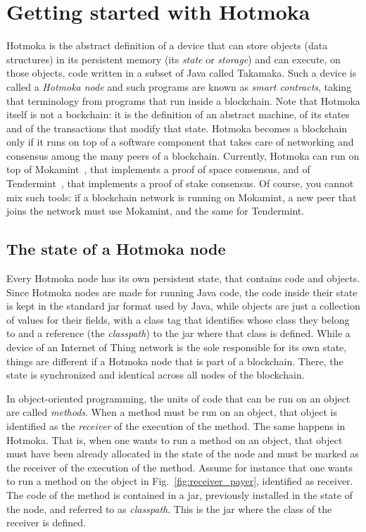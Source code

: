 \chapter{Getting started with Hotmoka}\label{ch:getting_started_with_hotmoka}

Hotmoka is the abstract definition of a device that can store
objects (data structures) in its persistent memory
(its \emph{state} or \emph{storage})
and can execute, on those objects,
code written in a subset of Java called Takamaka. Such a device is
called a \emph{Hotmoka node} and such programs are known as
\emph{smart contracts}, taking that terminology from programs that run inside
a blockchain. Note that Hotmoka itself is not a bockchain: it is the
definition of an abstract machine, of its states and of the transactions
that modify that state. Hotmoka becomes a blockchain only if it runs on top
of a software component that takes care of networking and consensus among
the many peers of a blockchain. Currently, Hotmoka can run on top of
Mokamint~\cite{mokamint_github}, that implements a proof of space consensus,
and of Tendermint~\cite{Tendermint}, that implements a proof of stake consensus.
Of course, you cannot mix such tools: if a blockchain network is running
on Mokamint, a new peer that joins the network must use Mokamint, and the same for Tendermint.

\section{The state of a Hotmoka node}\label{hotmoka_state}

Every Hotmoka node has its own persistent state, that contains code and
objects. Since Hotmoka nodes are made for running Java code, the code
inside their state is kept in the standard jar format used by Java, while objects
are just a collection of values for their fields, with a class tag that identifies
whose class they belong to and a reference (the \emph{classpath})
to the jar where that class is defined.
While a device of an Internet of Thing network is the sole responsible
for its own state, things are different if a Hotmoka node that is part of a blockchain.
There, the state is synchronized and identical across all nodes of the blockchain.

In object-oriented programming, the units of code that can be run
on an object are called \emph{methods}.
When a method must be run on an object,
that object is identified as the \emph{receiver} of the execution of the method.
The same happens in Hotmoka. That is, when one wants to run a method
on an object, that object must have been already allocated
in the state of the node and must be marked as the receiver of the execution
of the method. Assume for instance that one wants to run a method
on the object in Fig.~\ref{fig:receiver_payer}, identified as receiver.
The code of the method is contained in a jar, previously installed in the state
of the node, and referred to as \emph{classpath}. This is the jar where the class of
the receiver is defined.

